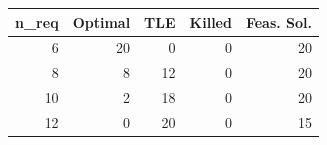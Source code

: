 
\begin{tabular}{rrrrr}
\toprule
n\_req & Optimal & TLE & Killed & Feas. Sol.\\
\midrule
6 & 20 & 0 & 0 & 20\\
8 & 8 & 12 & 0 & 20\\
10 & 2 & 18 & 0 & 20\\
12 & 0 & 20 & 0 & 15\\
\bottomrule
\end{tabular}
